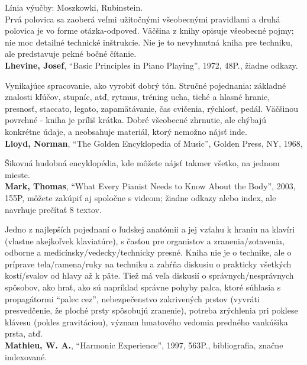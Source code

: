 \documentclass[11pt,a4paper]{book}
\begin{document}
Línia výučby: Moszkowki, Rubinstein.\\
Prvá polovica sa zaoberá veľmi užitočnými všeobecnými pravidlami a druhá polovica je vo forme otázka-odpoveď. Väčšina z knihy opisuje všeobecné pojmy; nie moc detailné technické inštrukcie. Nie je to nevyhnutná kniha pre techniku, ale predstavuje pekné bočné čítanie.
\medskip\\
\textbf{Lhevine, Josef}, “Basic Principles in Piano Playing”, 1972, 48P., žiadne odkazy. 

Vynikajúce spracovanie, ako vyrobiť dobrý tón. Stručné pojednania: základné znalosti kľúčov, stupníc, atď, rytmus, tréning ucha, tiché a hlasné hranie, presnosť, staccato, legato, zapamätávanie, čas cvičenia, rýchlosť, pedál. Väčšinou povrchné - kniha je príliš krátka. Dobré všeobecné zhrnutie, ale chýbajú konkrétne údaje, a neobsahuje materiál, ktorý nemožno nájsť inde.
\medskip\\
\textbf{Lloyd, Norman}, “The Golden Encyklopedia of Music”, Golden Press, NY, 1968, 

Šikovná hudobná encyklopédia, kde môžete nájsť takmer všetko, na jednom mieste.
\medskip\\
\textbf{\hypertarget{r:mark}{Mark, Thomas}}, “What Every Pianist Needs to Know About the Body”, 2003, 155P, môžete zakúpiť aj spoločne s videom; žiadne odkazy alebo index, ale navrhuje prečítať 8 textov. 

Jedno z najlepších pojednaní o ľudskej anatómii a jej vzťahu k hraniu na klavíri (vlastne akejkoľvek klaviatúre), s časťou  pre organistov a zranenia/zotavenia, odborne a medicínsky/vedecky/technicky presné. Kniha nie je o technike, ale o príprave tela/ramena/ruky na techniku a zahŕňa diskusiu o prakticky všetkých kostí/svalov od hlavy až k päte. Tiež má veľa diskusií o správnych/nesprávnych spôsobov, ako hrať, ako sú napríklad správne pohyby palca, ktoré súhlasia s propagátormi “palec cez”, nebezpečenstvo zakrivených prstov (vyvráti presvedčenie, že ploché prsty spôsobujú zranenie), potreba zrýchlenia pri poklese klávesu (pokles gravitáciou), význam hmatového vedomia predného vankúšika prsta, atď.
\medskip\\
\textbf{Mathieu, W. A.}, “Harmonic Experience”, 1997, 563P., bibliografia, značne indexované. 
\end{document}
